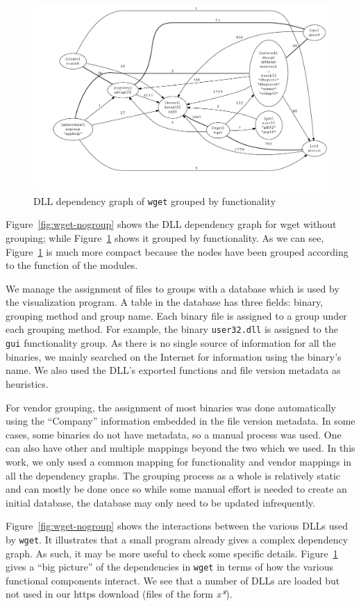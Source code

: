 \begin{figure}[thb]
\centering
\includegraphics[width=1.0\columnwidth]{depvis/wget-function.pdf}
\caption{DLL dependency graph of {\tt wget} grouped by functionality}
\label{fig:wget-function}
\end{figure}

Figure~\ref{fig:wget-nogroup} shows the DLL
dependency graph for wget without grouping; while
Figure~\ref{fig:wget-function} shows it grouped by functionality.
As we can see, Figure~\ref{fig:wget-function} is much more compact
because the nodes have been grouped according to the function of the modules.

We manage the assignment of files to groups with a database which is
used by the visualization program.
A table in the database has three fields: binary,
grouping method and group name.
Each binary file is assigned to a group under each grouping method.
For example, the binary {\tt user32.dll} is assigned to the {\tt gui}
functionality group.
As there is no single source of information for all the binaries, we mainly
searched on the Internet for information using the binary's name.
We also used the DLL's exported functions and file version metadata
as heuristics.

For vendor grouping, the assignment of most binaries was done automatically
using the ``Company'' information embedded in the file version metadata.
In some cases, some binaries do not have metadata, so a manual process
was used.
One can also have other and multiple mappings beyond the two which we used.
In this work, we only used a
common mapping for functionality and vendor mappings
in all the dependency graphs.
The grouping process as a whole is relatively static and can mostly be
done once so while some manual effort is needed to create an initial
database, the database may only need to be updated infrequently.

Figure~\ref{fig:wget-nogroup} shows the interactions
between the various DLLs used by {\tt wget}.
It illustrates that a small program already
gives a complex dependency graph.
As such, it may be more useful to check some specific details.
Figure~\ref{fig:wget-function} gives
a ``big picture'' of the dependencies
in {\tt wget} in terms of how the various functional
components interact.
We see that a number of DLLs are loaded but not used in our https download
(files of the form {\it *x*}).

